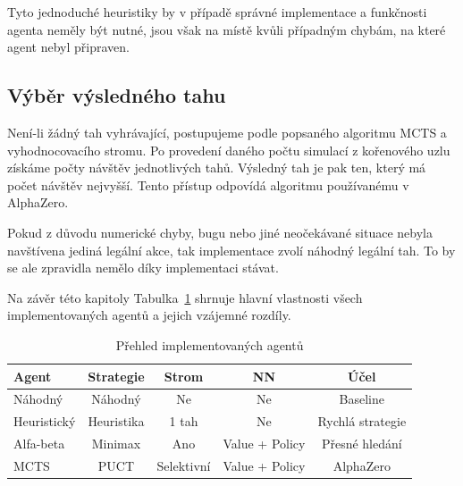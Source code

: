 Tyto jednoduché heuristiky by v případě správné implementace a funkčnosti agenta neměly být nutné, jsou však na místě kvůli případným
chybám, na které agent nebyl připraven.

\subsection{Výběr výsledného tahu}

Není-li žádný tah vyhrávající, postupujeme podle popsaného algoritmu MCTS a vyhodnocovacího stromu.
Po provedení daného počtu simulací z kořenového uzlu získáme počty návštěv jednotlivých tahů. Výsledný tah je pak ten, který má počet návštěv nejvyšší. 
Tento přístup odpovídá algoritmu používanému v AlphaZero\cite{silver2017alphazero}.

Pokud z důvodu numerické chyby, bugu nebo jiné neočekávané situace nebyla navštívena jediná legální akce, tak implementace zvolí náhodný
legální tah. To by se ale zpravidla nemělo díky implementaci stávat.

Na závěr této kapitoly Tabulka~\ref{tab:agents_summary} shrnuje hlavní vlastnosti všech implementovaných agentů a jejich vzájemné rozdíly.

\begin{table}[H]
\centering
\caption{Přehled implementovaných agentů}
\label{tab:agents_summary}

\begin{tabular}{lcccc}
\toprule
Agent & Strategie & Strom & NN & Účel \\
\midrule
Náhodný
& Náhodný
& Ne
& Ne
& Baseline \\

Heuristický
& Heuristika
& 1 tah
& Ne
& Rychlá strategie \\

Alfa-beta
& Minimax
& Ano
& Value + Policy
& Přesné hledání \\

MCTS
& PUCT
& Selektivní
& Value + Policy
& AlphaZero \\

\bottomrule
\end{tabular}
\end{table}